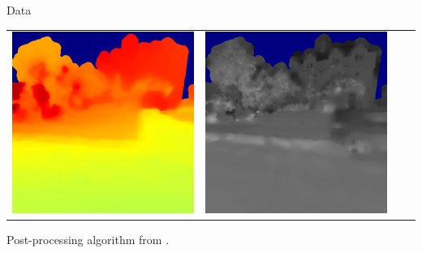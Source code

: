 \begin{frame}{Data}
\begin{tabular}{c c c c}
		\includegraphics[width=\widthcase]{images/dataset/depth_000052_mono_right.jpg} &
		\includegraphics[width=\widthcase]{images/dataset/ref_000052_mono_right.jpg} \\
	\end{tabular}
	\vfill
	Post-processing algorithm from \cite{Bevilacqua2017}.
\end{frame}

